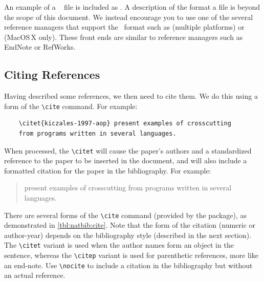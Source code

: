 An example of a \BibTeX\  file is included as
.  A description of the format a 
file is beyond the scope of this document.  We instead encourage
you to use one of the several reference managers that support the
\BibTeX\ format such as
 (multiple platforms) or
 (MacOS\,X only). 
These front ends are similar to reference managers such as
EndNote or RefWorks.


\subsection{Citing References}

Having described some references, we then need to cite them.  We
do this using a form of the \verb+\cite+ command.  For example:
\begin{lstlisting}
    \citet{kiczales-1997-aop} present examples of crosscutting 
    from programs written in several languages.
\end{lstlisting}
When processed, the \verb+\citet+ will cause the paper's authors
and a standardized reference to the paper to be inserted in the
document, and will also include a formatted citation for the paper
in the bibliography.  For example:
\begin{quote}
    \citet{kiczales-1997-aop} present examples of crosscutting 
    from programs written in several languages.
\end{quote}
There are several forms of the \verb+\cite+ command (provided
by the  package), as demonstrated in
\autoref{tbl:natbib:cite}.
Note that the form of the citation (numeric or author-year) depends
on the bibliography style (described in the next section).
The \verb+\citet+ variant is used when the author names form
an object in the sentence, whereas the \verb+\citep+ variant
is used for parenthetic references, more like an end-note.
Use \verb+\nocite+ to include a citation in the bibliography
but without an actual reference.
\nocite{rowling-1997-hpps}
